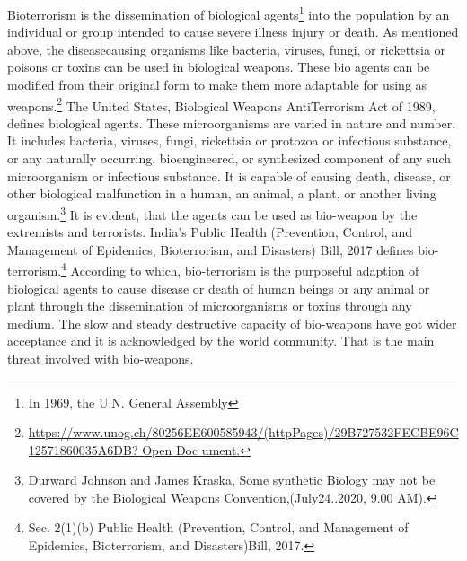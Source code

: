 \begin{multicols}{2}
\noi
Bioterrorism is the dissemination of biological agents\footnote{In 1969, the U.N. General Assembly} into the population by an individual
or group intended to cause severe illness injury or death. As mentioned above, the diseasecausing organisms like bacteria, viruses, fungi, or rickettsia or poisons or toxins can be used
in biological weapons. These bio agents can be modified from their original form to make 
them more adaptable for using as weapons.\footnote{\url{https://www.unog.ch/80256EE600585943/(httpPages)/29B727532FECBE96C12571860035A6DB? Open Doc
ument.}} The United States, Biological Weapons AntiTerrorism Act of 1989, defines biological agents. These microorganisms are varied in nature
and number. It includes bacteria, viruses, fungi, rickettsia or protozoa or infectious substance,
or any naturally occurring, bioengineered, or synthesized component of any such
microorganism or infectious substance. It is capable of causing death, disease, or other
biological malfunction in a human, an animal, a plant, or another living organism.\footnote{Durward Johnson and James Kraska, Some synthetic Biology may not be covered by the Biological Weapons
Convention,(July24..2020, 9.00 AM).} It is
evident, that the agents can be used as bio-weapon by the extremists and terrorists. India's
Public Health (Prevention, Control, and Management of Epidemics, Bioterrorism, and
Disasters) Bill, 2017 defines bio-terrorism.\footnote{Sec. 2(1)(b) Public Health (Prevention, Control, and Management of Epidemics, Bioterrorism, and
Disasters)Bill, 2017.} According to which, bio-terrorism is the
purposeful adaption of biological agents to cause disease or death of human beings or any
animal or plant through the dissemination of microorganisms or toxins through any medium.
The slow and steady destructive capacity of bio-weapons have got wider acceptance and it is
acknowledged by the world community. That is the main threat involved with bio-weapons. 



\end{multicols}
